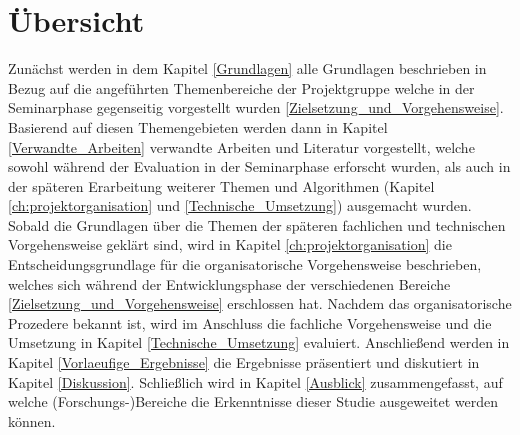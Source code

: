 \section{Übersicht}

Zunächst werden in dem Kapitel \ref{Grundlagen} alle Grundlagen beschrieben in Bezug auf die angeführten Themenbereiche der Projektgruppe welche in der Seminarphase gegenseitig vorgestellt wurden \ref{Zielsetzung_und_Vorgehensweise}. Basierend auf diesen Themengebieten werden dann in Kapitel \ref{Verwandte_Arbeiten} verwandte Arbeiten und Literatur vorgestellt, welche sowohl während der Evaluation in der Seminarphase erforscht wurden, als auch in der späteren Erarbeitung weiterer Themen und Algorithmen (Kapitel \ref{ch:projektorganisation} und \ref{Technische_Umsetzung}) ausgemacht wurden. Sobald die Grundlagen über die Themen der späteren fachlichen und technischen Vorgehensweise geklärt sind, wird in Kapitel \ref{ch:projektorganisation} die Entscheidungsgrundlage für die organisatorische Vorgehensweise beschrieben, welches sich während der Entwicklungsphase der verschiedenen Bereiche \ref{Zielsetzung_und_Vorgehensweise} erschlossen hat. Nachdem das organisatorische Prozedere bekannt ist, wird im Anschluss die fachliche Vorgehensweise und die Umsetzung in Kapitel \ref{Technische_Umsetzung} evaluiert. Anschließend werden in Kapitel \ref{Vorlaeufige_Ergebnisse} die Ergebnisse präsentiert und diskutiert in Kapitel \ref{Diskussion}. Schließlich wird in Kapitel \ref{Ausblick} zusammengefasst, auf welche (Forschungs-)Bereiche die Erkenntnisse dieser Studie ausgeweitet werden können.